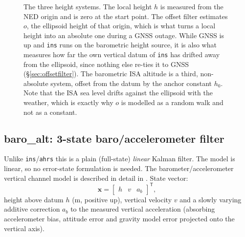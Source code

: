 \documentclass[11pt,a4paper]{article}
\newcommand{\vect}[1]{\bm{#1}}
\newcommand{\T}{^{\mathsf{T}}}
\newcommand{\code}[1]{\texttt{#1}}
\begin{document}
\begin{figure}[htbp]
\caption{The three height systems. The local height $h$ is measured from
the NED origin and is zero at the start point. The offset filter
estimates $o$, the ellipsoid height of that origin, which is what turns
a local height into an absolute one during a GNSS outage. While
GNSS is up and \code{ins} runs on the barometric height source, it is also what
measures how far the own vertical datum of \code{ins} has drifted away from
the ellipsoid, since nothing else re-ties it to GNSS
(\S\ref{sec:offsetfilter}). The barometric
ISA altitude is a third, non-absolute system, offset from the datum by
the anchor constant $h_0$. Note that the ISA sea level drifts against
the ellipsoid with the weather, which is exactly why $o$ is modelled
as a random walk and not as a constant.}
\label{fig:heightsystems}
\end{figure}

\subsection{baro\_alt: 3-state baro/accelerometer filter}
\label{sec:baroalt}

Unlike \code{ins}/\code{ahrs} this is a plain (full-state) \emph{linear} Kalman
filter. The model is linear, so no error-state formulation is needed.
The barometer/accelerometer vertical channel model is described in detail in
\cite{meister2010}. State vector:
\begin{equation}
  \vect{x} = \begin{bmatrix} h & v & a_b \end{bmatrix}\T ,
\end{equation}
height above datum $h$ (\si{\metre}, positive up), vertical velocity
$v$ and a slowly varying additive correction $a_b$ to the measured
vertical acceleration (absorbing accelerometer bias, attitude error and
gravity model error projected onto the vertical axis).
\end{document}
